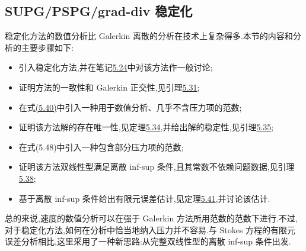 \subsection{SUPG/PSPG/grad-div 稳定化}\label{subsec:oseen-spg-stabilization}

\begin{note}[本节内容]\label{note:oseen-spg-section-overview}
稳定化方法的数值分析比 Galerkin 离散的分析在技术上复杂得多.本节的内容和分析的主要步骤如下:
\begin{itemize}
  \item 引入稳定化方法,并在笔记\hyperref[note:oseen-spg-method]{5.24}中对该方法作一般讨论;
  \item 证明方法的一致性和 Galerkin 正交性,见引理\hyperref[lem:oseen-spg-consistency-orthogonality]{5.31};
  \item 在式\hyperref[eq:oseen-spg-norm]{(5.40)}中引入一种用于数值分析、几乎不含压力项的范数;
  \item 证明该方法解的存在唯一性,见定理\hyperref[thm:oseen-spg-existence-uniqueness]{5.34},并给出解的稳定性,见引理\hyperref[lem:oseen-spg-stability]{5.35};
  \item 在式(5.48)中引入一种包含部分压力项的范数;
  \item 证明该方法双线性型满足离散 inf-sup 条件,且其常数不依赖问题数据,见引理\hyperref[lem:oseen-spg-discrete-infsup]{5.38};
  \item 基于离散 inf-sup 条件给出有限元误差估计,见定理\hyperref[thm:oseen-spg-error-estimate]{5.41},并讨论该估计.
\end{itemize}
总的来说,速度的数值分析可以在强于 Galerkin 方法所用范数的范数下进行.不过,对于稳定化方法,如何在分析中恰当地纳入压力并不容易.与 Stokes 方程的有限元误差分析相比,这里采用了一种新思路:从完整双线性型的离散 inf-sup 条件出发.
\end{note}

